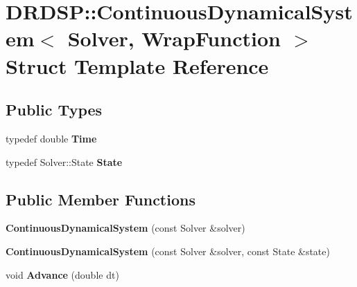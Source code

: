 \hypertarget{struct_d_r_d_s_p_1_1_continuous_dynamical_system}{\section{D\-R\-D\-S\-P\-:\-:Continuous\-Dynamical\-System$<$ Solver, Wrap\-Function $>$ Struct Template Reference}
\label{struct_d_r_d_s_p_1_1_continuous_dynamical_system}
}
\subsection*{Public Types}
\begin{DoxyCompactItemize}
\item 
\hypertarget{struct_d_r_d_s_p_1_1_continuous_dynamical_system_ac13a0e7c10ab1e64992bdf5e8a90c4ca}{typedef double {\bfseries Time}}\label{struct_d_r_d_s_p_1_1_continuous_dynamical_system_ac13a0e7c10ab1e64992bdf5e8a90c4ca}

\item 
\hypertarget{struct_d_r_d_s_p_1_1_continuous_dynamical_system_a248356acb4acbfd94c55fb6d905b0e39}{typedef Solver\-::\-State {\bfseries State}}\label{struct_d_r_d_s_p_1_1_continuous_dynamical_system_a248356acb4acbfd94c55fb6d905b0e39}

\end{DoxyCompactItemize}
\subsection*{Public Member Functions}
\begin{DoxyCompactItemize}
\item 
\hypertarget{struct_d_r_d_s_p_1_1_continuous_dynamical_system_a54d146f2c7d24db193840453aaeab0c6}{{\bfseries Continuous\-Dynamical\-System} (const Solver \&solver)}\label{struct_d_r_d_s_p_1_1_continuous_dynamical_system_a54d146f2c7d24db193840453aaeab0c6}

\item 
\hypertarget{struct_d_r_d_s_p_1_1_continuous_dynamical_system_a7654747aeb3a95822d4fa9f5196fed00}{{\bfseries Continuous\-Dynamical\-System} (const Solver \&solver, const State \&state)}\label{struct_d_r_d_s_p_1_1_continuous_dynamical_system_a7654747aeb3a95822d4fa9f5196fed00}

\item 
\hypertarget{struct_d_r_d_s_p_1_1_continuous_dynamical_system_a242ddd4252b8a2ba9491f7df3ca4cf9c}{void {\bfseries Advance} (double dt)}\label{struct_d_r_d_s_p_1_1_continuous_dynamical_system_a242ddd4252b8a2ba9491f7df3ca4cf9c}

\end{DoxyCompactItemize}
